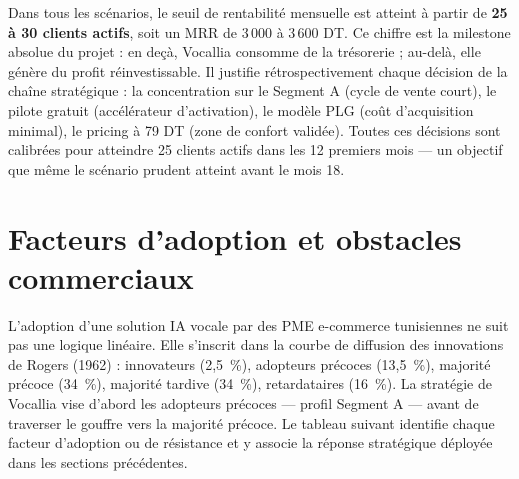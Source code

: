 \begin{tcolorbox}[colback=gray!8, colframe=gray!50, title=\textbf{Seuil critique opérationnel}, fonttitle=\bfseries]
Dans tous les scénarios, le seuil de rentabilité mensuelle est atteint à partir de \textbf{25 à 30 clients actifs}, soit un MRR de 3\,000 à 3\,600 DT. Ce chiffre est la milestone absolue du projet : en deçà, Vocallia consomme de la trésorerie ; au-delà, elle génère du profit réinvestissable. Il justifie rétrospectivement chaque décision de la chaîne stratégique : la concentration sur le Segment A (cycle de vente court), le pilote gratuit (accélérateur d'activation), le modèle PLG (coût d'acquisition minimal), le pricing à 79 DT (zone de confort validée). Toutes ces décisions sont calibrées pour atteindre 25 clients actifs dans les 12 premiers mois --- un objectif que même le scénario prudent atteint avant le mois 18.
\end{tcolorbox}

\section{Facteurs d'adoption et obstacles commerciaux}
\label{section3.11}

L'adoption d'une solution IA vocale par des PME e-commerce tunisiennes ne suit pas une logique linéaire. Elle s'inscrit dans la courbe de diffusion des innovations de Rogers (1962) : innovateurs (2,5~\%), adopteurs précoces (13,5~\%), majorité précoce (34~\%), majorité tardive (34~\%), retardataires (16~\%). La stratégie de Vocallia vise d'abord les adopteurs précoces --- profil Segment A --- avant de traverser le \og{}gouffre\fg{} vers la majorité précoce. Le tableau suivant identifie chaque facteur d'adoption ou de résistance et y associe la réponse stratégique déployée dans les sections précédentes.

